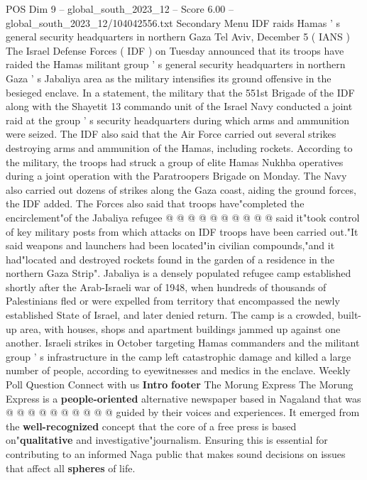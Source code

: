 \begin{textsample}{POS Dim 9 – global\_south\_2023\_12 – Score 6.00 – global\_south\_2023\_12/104042556.txt}  \label{ex:f9_pos_007}
Secondary Menu IDF raids Hamas ' s general security headquarters in northern Gaza Tel Aviv, December 5 ( IANS ) The Israel Defense Forces ( IDF ) on Tuesday announced that its troops have raided the Hamas militant group ' s general security headquarters in northern Gaza ' s Jabaliya area as the military intensifies its ground offensive in the besieged enclave.
In a statement, the military that the 551st Brigade of the IDF along with the Shayetit 13 commando unit of the Israel Navy conducted a joint raid at the group ' s security headquarters during which arms and ammunition were seized.
The IDF also said that the Air Force carried out several strikes destroying arms and ammunition of the Hamas, including rockets.
According to the military, the troops had struck a group of elite Hamas Nukhba operatives during a joint operation with the Paratroopers Brigade on Monday.
The Navy also carried out dozens of strikes along the Gaza coast, aiding the ground forces, the IDF added.
The Forces also said that troops have"completed the encirclement"of the Jabaliya refugee @ @ @ @ @ @ @ @ @ @ said it"took control of key military posts from which attacks on IDF troops have been carried out."It said weapons and launchers had been located"in civilian compounds,"and it had"located and destroyed rockets found in the garden of a residence in the northern Gaza Strip".
Jabaliya is a densely populated refugee camp established shortly after the Arab-Israeli war of 1948, when hundreds of thousands of Palestinians fled or were expelled from territory that encompassed the newly established State of Israel, and later denied return.
The camp is a crowded, built-up area, with houses, shops and apartment buildings jammed up against one another.
Israeli strikes in October targeting Hamas commanders and the militant group ' s infrastructure in the camp left catastrophic damage and killed a large number of people, according to eyewitnesses and medics in the enclave.
Weekly Poll Question Connect with us \textbf{Intro} \textbf{footer} The Morung Express The Morung Express is a \textbf{people-oriented} alternative newspaper based in Nagaland that was @ @ @ @ @ @ @ @ @ @ guided by their voices and experiences.
It emerged from the \textbf{well-recognized} concept that the core of a free press is based on"\textbf{qualitative} and investigative"journalism.
Ensuring this is essential for contributing to an informed Naga public that makes sound decisions on issues that affect all \textbf{spheres} of life.

\end{textsample}
